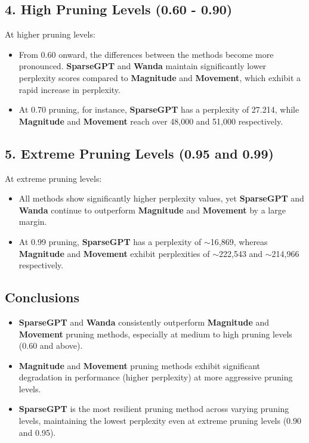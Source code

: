 \documentclass{article} %
\begin{document}
\subsection*{4. High Pruning Levels (0.60 - 0.90)}
At higher pruning levels:
\begin{itemize}
    \item From 0.60 onward, the differences between the methods become more pronounced. \textbf{SparseGPT} and \textbf{Wanda} maintain significantly lower perplexity scores compared to \textbf{Magnitude} and \textbf{Movement}, which exhibit a rapid increase in perplexity.
    \item At 0.70 pruning, for instance, \textbf{SparseGPT} has a perplexity of 27.214, while \textbf{Magnitude} and \textbf{Movement} reach over 48,000 and 51,000 respectively.
\end{itemize}

\subsection*{5. Extreme Pruning Levels (0.95 and 0.99)}
At extreme pruning levels:
\begin{itemize}
    \item All methods show significantly higher perplexity values, yet \textbf{SparseGPT} and \textbf{Wanda} continue to outperform \textbf{Magnitude} and \textbf{Movement} by a large margin.
    \item At 0.99 pruning, \textbf{SparseGPT} has a perplexity of $\sim$16,869, whereas \textbf{Magnitude} and \textbf{Movement} exhibit perplexities of $\sim$222,543 and $\sim$214,966 respectively.
\end{itemize}

\subsection*{Conclusions}
\begin{itemize}
    \item \textbf{SparseGPT} and \textbf{Wanda} consistently outperform \textbf{Magnitude} and \textbf{Movement} pruning methods, especially at medium to high pruning levels (0.60 and above).
    \item \textbf{Magnitude} and \textbf{Movement} pruning methods exhibit significant degradation in performance (higher perplexity) at more aggressive pruning levels.
    \item \textbf{SparseGPT} is the most resilient pruning method across varying pruning levels, maintaining the lowest perplexity even at extreme pruning levels (0.90 and 0.95).
\end{itemize}
\end{document}
